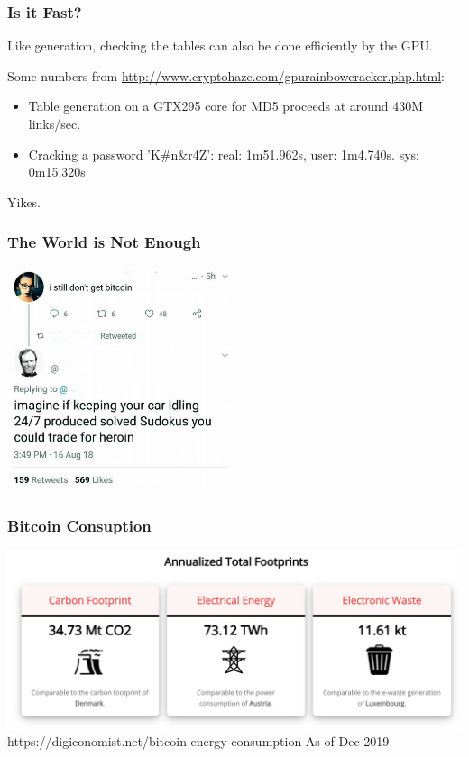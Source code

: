 \begin{frame}
\frametitle{Is it Fast?}

Like generation, checking the tables can also be done efficiently by the GPU.

Some numbers from \url{http://www.cryptohaze.com/gpurainbowcracker.php.html}: 

\begin{itemize}
	\item Table generation on a GTX295 core for MD5 proceeds at around 430M links/sec.
	\item Cracking a password 'K\#n\&r4Z': real: 1m51.962s, user: 1m4.740s. sys: 0m15.320s
\end{itemize}

Yikes.

\end{frame}


\begin{frame}
\frametitle{The World is Not Enough}

\begin{center}
	\includegraphics[width=0.5\textwidth]{images/bitcoin.png}
\end{center}


\end{frame}


\begin{frame}
\frametitle{Bitcoin Consuption}

\begin{center}
	\includegraphics[width=\textwidth]{images/Bitcoin-usage.png}\\
	\hfill https://digiconomist.net/bitcoin-energy-consumption As of Dec 2019
\end{center}


\end{frame}

